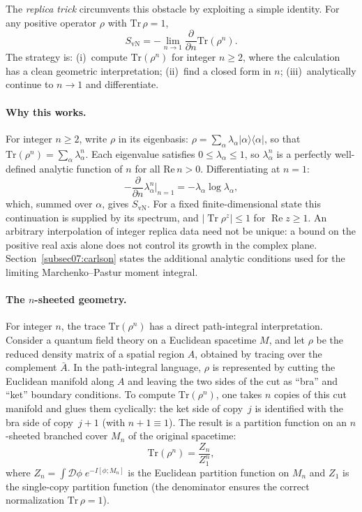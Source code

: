 \documentclass[11pt,letterpaper]{article}
\theoremstyle{plain}
\theoremstyle{definition}
\theoremstyle{remark}
\begin{document}
The \emph{replica trick} circumvents this obstacle by exploiting a simple
identity.  For any positive operator $\rho$ with $\mathrm{Tr}\,\rho = 1$,
\begin{equation}
\label{eq06:replica_identity}
S_{\mathrm{vN}} = -\lim_{n \to 1} \frac{\partial}{\partial n}
  \mathrm{Tr}(\rho^n).
\end{equation}
The strategy is: (i)~compute $\mathrm{Tr}(\rho^n)$ for integer $n \geq 2$,
where the calculation has a clean geometric interpretation; (ii)~find a closed
form in $n$; (iii)~analytically continue to $n \to 1$ and differentiate.

\paragraph{Why this works.}
For integer $n \geq 2$, write $\rho$ in its eigenbasis:
$\rho = \sum_\alpha \lambda_\alpha |\alpha\rangle\langle\alpha|$, so that
$\mathrm{Tr}(\rho^n) = \sum_\alpha \lambda_\alpha^n$.  Each eigenvalue
satisfies $0 \leq \lambda_\alpha \leq 1$, so $\lambda_\alpha^n$ is a perfectly
well-defined analytic function of $n$ for all $\mathrm{Re}\,n > 0$.
Differentiating at $n = 1$:
\begin{equation}
\label{eq06:derivative_at_one}
-\frac{\partial}{\partial n} \lambda_\alpha^n \Big|_{n=1}
  = -\lambda_\alpha \log \lambda_\alpha,
\end{equation}
which, summed over $\alpha$, gives $S_{\mathrm{vN}}$.  For a fixed finite-dimensional state this continuation is supplied by its
spectrum, and $|\operatorname{Tr}\rho^z|\leq1$ for $\operatorname{Re}z\geq1$.
An arbitrary interpolation of integer replica data need not be unique:
a bound on the positive real axis alone does not control its growth in the
complex plane.  Section~\ref{subsec07:carlson} states the additional analytic
conditions used for the limiting Marchenko--Pastur moment integral.

\paragraph{The $n$-sheeted geometry.}
For integer $n$, the trace $\mathrm{Tr}(\rho^n)$ has a direct path-integral
interpretation.  Consider a quantum field theory on a Euclidean spacetime $M$,
and let $\rho$ be the reduced density matrix of a spatial region $A$, obtained
by tracing over the complement $\bar{A}$.  In the path-integral language,
$\rho$ is represented by cutting the Euclidean manifold along $A$ and leaving
the two sides of the cut as ``bra'' and ``ket'' boundary conditions.  To compute
$\mathrm{Tr}(\rho^n)$, one takes $n$ copies of this cut manifold and glues
them cyclically: the ket side of copy~$j$ is identified with the bra side of
copy~$j+1$ (with $n + 1 \equiv 1$).  The result is a partition function on an
$n$-sheeted branched cover $M_n$ of the original spacetime:
\begin{equation}
\label{eq06:n_sheeted_partition}
\mathrm{Tr}(\rho^n) = \frac{Z_n}{Z_1^n},
\end{equation}
where $Z_n = \int \mathcal{D}\phi\; e^{-I[\phi; M_n]}$ is the Euclidean
partition function on $M_n$ and $Z_1$ is the single-copy partition function
(the denominator ensures the correct normalization
$\mathrm{Tr}\,\rho = 1$).
\end{document}
